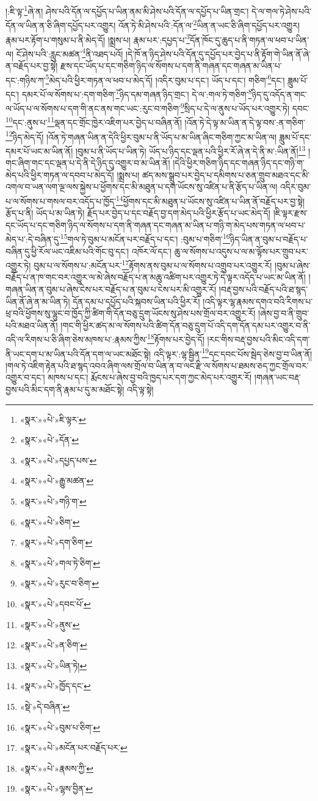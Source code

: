 །:ཇི་ལྟ་\footnote{«སྣར་»«པེ་»ཇི་ལྟར་}ཞེ་ན། ཤེས་པའི་དོན་ལ་དཔྱོད་པ་ཡིན་ནམ་མི་ཤེས་པའི་དོན་ལ་དཔྱོད་པ་ཡིན་གྲང་། དེ་ལ་གལ་ཏེ་ཤེས་པའི་དོན་ལ་ཡིན་ན་ཅི་ཞིག་དཔྱོད་པར་འགྱུར། འོན་ཏེ་མི་ཤེས་པའི་:དོན་ལ་\footnote{«སྣར་»«པེ་»དོན་}ཡིན་ན་ཡང་ཅི་ཞིག་དཔྱོད་པར་འགྱུར། རྣམ་པར་རྟོག་པ་གསུམ་པ་ནི་མེད་དོ། །སྨྲས་པ། རྣམ་པར་:དཔྱད་པ་\footnote{«སྣར་»«པེ་»དཔྱད་པས་}དོན་ཁོང་དུ་ཆུད་པ་ནི་གཏན་ལ་ཕབ་པ་ཡིན་ལ། ངོ་ཤེས་པའི་:རླུང་མཚན་\footnote{«སྣར་»«པེ་»རྒྱུ་མཚན་}ནི་འཐད་པའོ། །དེ་ཁོ་ན་ཉིད་ཤེས་པའི་དོན་དུ་དཔྱོད་པར་བྱེད་པ་ནི་རྟོག་གེ་ཡིན་ནོ་ཞེ་ན་བརྗོད་པར་བྱ་སྟེ། རྫས་དང་ཡོད་པ་དང་གཅིག་ཉིད་ལ་སོགས་པ་དག་ནི་གཞན་དང་གཞན་མ་ཡིན་པ་དང་:གཉིས་ཀ་\footnote{«སྣར་»«པེ་»གཉི་ག་}མེད་པའི་ཕྱིར་གཏན་ལ་ཕབ་པ་མེད་དོ། །འདིར་བུམ་པ་དང་། ཡོད་པ་དང་། གཅིག་\footnote{«སྣར་»«པེ་»ཅིག་}དང་། ཟླུམ་པོ་དང་། དམར་པོ་ལ་སོགས་པ་:དག་གཅིག་\footnote{«སྣར་»«པེ་»དག་ཅིག་}ཉིད་དམ་གཞན་ཉིད་གྲང་། དེ་ལ་:གལ་ཏེ་གཅིག་\footnote{«སྣར་»«པེ་»གལ་ཏེ་ཅིག་}ཉིད་དུ་འདོད་ན་གང་ལ་ཡོད་པ་ལ་སོགས་པ་དག་གི་ནང་ནས་གང་ཡང་:རུང་བ་གཅིག་\footnote{«སྣར་»«པེ་»རུང་བ་ཅིག་}སྲིད་པ་དེ་ལ་ནུས་པ་ཡོད་པར་འགྱུར་ཏེ། དབང་\footnote{«སྣར་»«པེ་»དབང་པོ་}དང་:ནུས་པ་\footnote{«སྣར་»«པེ་»ནུས་}ལྡན་དང་གྲོང་ཁྱེར་འཇིག་པར་བྱེད་པ་བཞིན་ནོ། །འོན་ཏེ་དེ་ལྟ་མ་ཡིན་ན་དེ་ལྟ་བས་:ན་གཅིག་\footnote{«སྣར་»«པེ་»ན་ཅིག་}ཉིད་མེད་དོ། །འོན་ཏེ་གཞན་ཡིན་ན་དེའི་ཕྱིར་བུམ་པ་ནི་ཡོད་པ་མ་ཡིན་ཞིང་གཅིག་ཀྱང་མ་ཡིན་ལ། ཟླུམ་པོ་དང་དམར་པོ་ཡང་མ་ཡིན་ནོ། །བུམ་པ་ནི་ཡོད་པ་ཡིན་ཏེ། ཡོད་པ་ཉིད་དང་ལྡན་པའི་ཕྱིར་རོ་ཞེ་ན་དེ་ནི་མ་:ཡིན་ནོ།\footnote{«སྣར་»«པེ་»ཡིན་ཏེ།} །གང་ཞིག་གང་དང་ལྡན་པ་དེ་ནི་དེ་ཉིད་དུ་འགྱུར་བ་མ་ཡིན་ནོ། །དེའི་ཕྱིར་གཅིག་ཉིད་དང་གཞན་ཉིད་དང་གཉི་ག་མེད་པའི་ཕྱིར་གཏན་ལ་དབབ་པ་མེད་དོ། །སྨྲས་པ། ཚད་མས་སྒྲུབ་པར་བྱེད་པ་དམིགས་པ་ཅན་གྲུབ་མཐའ་དང་མི་འགལ་བ་ཡན་ལག་ལྔ་ལས་སྐྱེས་པ་ཕྱོགས་དང་མི་མཐུན་པ་དག་ཡོངས་སུ་འཛིན་པ་ནི་རྩོད་པ་ཡིན་ལ། འདིར་བུམ་པ་ལ་སོགས་པ་གསལ་བར་འདོད་པ་ཁྱོད་\footnote{«སྣར་»«པེ་»ཁྱོད་དང་}ཕྱོགས་དང་མི་མཐུན་པ་ཡོངས་སུ་འཛིན་པ་ཡིན་ནོ་བརྗོད་པར་བྱ་སྟེ། རྩོད་པ་ནི། ཡོད་པ་མ་ཡིན་ཏེ། རྗོད་པར་བྱེད་པ་དང་བརྗོད་བྱ་དག་མེད་པའི་ཕྱིར་རྩོད་པ་ཡང་མེད་དོ། །ཇི་ལྟར་རྫས་དང་ཡོད་པ་དང་གཅིག་ཉིད་ལ་སོགས་པ་དག་ནི་གཞན་དང་གཞན་མ་ཡིན་པ་གཉི་ག་མེད་པས་གཏན་ལ་ཕབ་པ་མེད་པ་:དེ་བཞིན་དུ་\footnote{«སྡེ་»དེ་བཞིན་}གལ་ཏེ་བུམ་པ་མངོན་པར་བརྗོད་པ་དང་། :བུམ་པ་གཅིག་\footnote{«སྣར་»«པེ་»བུམ་པ་ཅིག་}ཉིད་ཡིན་ན་བུམ་པ་བརྗོད་པ་བཞིན་དུ་ཕྱི་རོལ་ཡང་འཇིམ་པའི་གོང་བུ་དང་། འཁོར་ལོ་དང་། ཆུ་ལ་སོགས་པ་འདུས་པ་ལ་མ་ལྟོས་པར་གྲུབ་པར་འགྱུར་ཏེ། བུམ་པ་ལ་སོགས་པ་:མངོན་པར་\footnote{«སྣར་»«པེ་»མངོན་པར་བརྗོད་པར་}རྟོགས་ནས་བུམ་པ་ལ་སོགས་པ་འགྲུབ་པར་འགྱུར་རོ། །བུམ་པ་ཞེས་བརྗོད་པ་ན་ཁ་གང་བར་འགྱུར་ལ་མེ་ཞེས་བརྗོད་པ་ན་མཆུ་འཚིག་པར་འགྱུར་ཏེ་དེ་ལྟར་འདོད་པ་ཡང་མ་ཡིན་ནོ། །གཞན་ཡིན་ན་བུམ་པ་ཞེས་ངེས་པར་བརྗོད་པ་ན་བུམ་པ་ངེས་པར་མི་འགྱུར་རོ། །བརྡ་བྱས་པའི་བརྗོད་པའི་ཐ་སྙད་ཡིན་ནོ་ཞེ་ན་མ་ཡིན་ཏེ། དོན་དམ་པ་དཔྱོད་པའི་སྐབས་ཡིན་པའི་ཕྱིར་རོ། །འདི་ལྟར་ལྷ་རྣམས་དགའ་བའི་རིགས་པ་ཕྲ་བའི་ཕྱོགས་སུ་ལྷུང་བ་ཁྱོད་ཀྱི་ཚིག་གི་དོན་བཅུ་དྲུག་ཡོངས་སུ་ཤེས་པས་གྲོལ་བར་འགྱུར་རོ། །ཞེས་བྱ་བ་ནི་གྲུབ་པའི་མཐའ་ཡིན་ནོ། །གང་གི་ཕྱིར་ཚད་མ་ལ་སོགས་པའི་ཚིག་དོན་བཅུ་དྲུག་པོ་འདི་དག་དོན་དམ་པར་འགྱུར་བ་ནི་འདི་ལ་རིགས་པ་ཅི་ཞིག་ཅེས་མཁས་པ་:རྣམས་ཀྱིས་\footnote{«སྣར་»«པེ་»རྣམས་ཀྱི་}རྟོགས་པར་བྱེད་དོ། །རང་གིས་བརྡ་བྱས་པའི་མིང་འདི་དག་ནི་ཡང་དག་པ་མ་ཡིན་པའི་དོན་དག་ལ་ཡང་མཐོང་སྟེ། འདི་ལྟར་:ལྷ་སྦྱིན་\footnote{«སྣར་»«པེ་»ལྷས་བྱིན་}དང་དབང་པོས་སྦེད་ཅེས་བྱ་བ་ཡིན་ནོ། །གལ་ཏེ་འཇིག་རྟེན་པའི་ཐ་སྙད་འབའ་ཞིག་ལས་གྲོལ་བ་ཡིན་ན་བ་ལང་རྫི་ལ་སོགས་པ་ཐམས་ཅད་ཀྱང་གྲོལ་བར་འགྱུར་བ་དང་། མཁས་པ་དང་། རྨོངས་པ་ཞེས་བྱ་བའི་ཁྱད་པར་དག་ཀྱང་མེད་པར་འགྱུར་རོ། །གཞན་ཡང་བརྡ་བྱས་པའི་མིང་དག་ནི་རྣམ་པ་དུ་མ་མཐོང་སྟེ། འདི་ལྟ་སྟེ། 